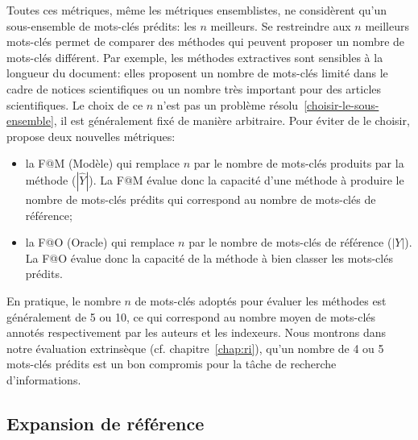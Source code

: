 Toutes ces métriques, même les métriques ensemblistes, ne considèrent qu'un sous-ensemble de mots-clés prédits: les $n$ meilleurs.
Se restreindre aux $n$ meilleurs mots-clés permet de comparer des méthodes qui peuvent proposer un nombre de mots-clés différent. Par exemple, les méthodes extractives sont sensibles à la longueur du document: elles proposent un nombre de mots-clés limité dans le cadre de notices scientifiques ou un nombre très important pour des articles scientifiques.
Le choix de ce $n$ n'est pas un problème résolu~\ref{choisir-le-sous-ensemble}, il est généralement fixé de manière arbitraire.
Pour éviter de le choisir, \cite{yuan_one_2020} propose deux nouvelles métriques: 
\begin{itemize}
    \item la F@M (Modèle) qui remplace $n$ par le nombre de mots-clés produits par la méthode ($|\hat{Y}|$). La F@M évalue donc la capacité d'une méthode à produire le nombre de mots-clés prédits qui correspond au nombre de mots-clés de référence; 
    \item la F@O (Oracle) qui remplace $n$ par le nombre de mots-clés de référence ($|Y|$). La F@O évalue donc la capacité de la méthode à bien classer les mots-clés prédits. 
\end{itemize}

En pratique, le nombre $n$ de mots-clés adoptés pour évaluer les méthodes est généralement de 5 ou 10, ce qui correspond au nombre moyen de mots-clés annotés respectivement par les auteurs et les indexeurs.
Nous montrons dans notre évaluation extrinsèque (cf. chapitre~\ref{chap:ri}), qu'un nombre de 4 ou 5 mots-clés prédits est un bon compromis pour la tâche de recherche d'informations.


\subsection{Expansion de référence}\label{sub:framework_expansion}

